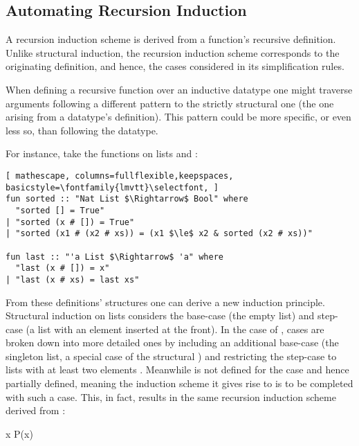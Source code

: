 \subsection{Automating Recursion Induction}
\label{sec:rec-ind}

A recursion induction scheme is derived from a function's recursive definition.
%
Unlike structural induction, the recursion induction scheme corresponds to the originating definition, and hence, the cases considered in its simplification rules.

When defining a recursive function over an inductive datatype one might traverse arguments following a different pattern to the strictly structural one (the one arising from a datatype's definition).
%
This pattern could be more specific, or even less so, than following the datatype.

For instance, take the functions on lists  and :

\begin{lstlisting}[ mathescape, columns=fullflexible,keepspaces, basicstyle=\fontfamily{lmvtt}\selectfont, ]
fun sorted :: "Nat List $\Rightarrow$ Bool" where
  "sorted [] = True"
| "sorted (x # []) = True"
| "sorted (x1 # (x2 # xs)) = (x1 $\le$ x2 & sorted (x2 # xs))"

fun last :: "'a List $\Rightarrow$ 'a" where
  "last (x # []) = x"
| "last (x # xs) = last xs"
\end{lstlisting}

\noindent From these definitions' structures one can derive a new induction principle.
%
Structural induction on lists considers the base-case \isaCode{[]} (the empty list) and step-case  (a list with an element inserted at the front).
%
In the case of , cases are broken down into more detailed ones by including an additional base-case  (the singleton list, a special case of the structural ) and restricting the step-case to lists with at least two elements .
%
Meanwhile  is not defined for the case \isaCode{[]} and hence partially defined, meaning the induction scheme it gives rise to is to be completed with such a case.
%
This, in fact, results in the same recursion induction scheme derived from :

\vspace{2 mm}

  {\forall x \;\; P\;(x)}

